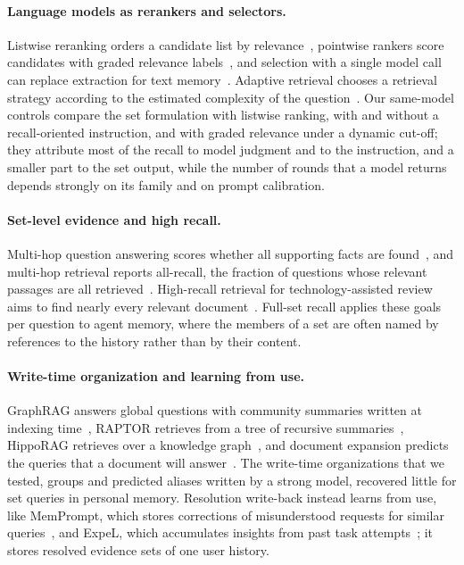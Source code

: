\paragraph{Language models as rerankers and selectors.} Listwise reranking orders a candidate list by relevance~\citep{sun2023rankgpt}, pointwise rankers score candidates with graded relevance labels~\citep{zhuang2024beyond}, and selection with a single model call can replace extraction for text memory~\citep{sharma2026selection}. Adaptive retrieval chooses a retrieval strategy according to the estimated complexity of the question~\citep{jeong2024adaptiverag}. Our same-model controls compare the set formulation with listwise ranking, with and without a recall-oriented instruction, and with graded relevance under a dynamic cut-off; they attribute most of the recall to model judgment and to the instruction, and a smaller part to the set output, while the number of rounds that a model returns depends strongly on its family and on prompt calibration.

\paragraph{Set-level evidence and high recall.} Multi-hop question answering scores whether all supporting facts are found~\citep{yang2018hotpotqa}, and multi-hop retrieval reports all-recall, the fraction of questions whose relevant passages are all retrieved~\citep{gutierrez2024hipporag}. High-recall retrieval for technology-assisted review aims to find nearly every relevant document~\citep{cormack2015autonomy}. Full-set recall applies these goals per question to agent memory, where the members of a set are often named by references to the history rather than by their content.

\paragraph{Write-time organization and learning from use.} GraphRAG answers global questions with community summaries written at indexing time~\citep{edge2024graphrag}, RAPTOR retrieves from a tree of recursive summaries~\citep{sarthi2024raptor}, HippoRAG retrieves over a knowledge graph~\citep{gutierrez2024hipporag}, and document expansion predicts the queries that a document will answer~\citep{nogueira2019doc2query}. The write-time organizations that we tested, groups and predicted aliases written by a strong model, recovered little for set queries in personal memory. Resolution write-back instead learns from use, like MemPrompt, which stores corrections of misunderstood requests for similar queries~\citep{madaan2022memprompt}, and ExpeL, which accumulates insights from past task attempts~\citep{zhao2024expel}; it stores resolved evidence sets of one user history.

